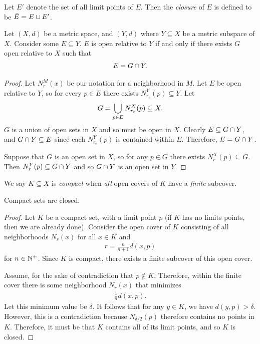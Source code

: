 \begin{defn}
    Let $E'$ denote the set of all limit points of $E$. Then the \emph{closure} of $E$ is defined to be $\bar{E} = E \cup E'$.
\end{defn}

\begin{thm}
    Let $(X, d)$ be a metric space, and $(Y, d)$ where $Y \subseteq X$ be a metric subspace of $X$. Consider some $E \subseteq Y$. $E$ is open relative to $Y$ if and only if there exists $G$ open relative to $X$ such that
    \begin{align*}
        E = G \cap Y.
    \end{align*}
\end{thm}

\begin{proof}
    Let $N_r^M(x)$ be our notation for a neighborhood in $M$. Let $E$ be open relative to $Y$, so for every $p \in E$ there exists $N_{r_e}^{Y}(p) \subseteq Y$. Let
    \begin{align*}
        G = \bigcup_{p \in E}N_{r_e}^{X}(p) \subseteq X.
    \end{align*}
    $G$ is a union of open sets in $X$ and so must be open in $X$. Clearly $E \subseteq G \cap Y$, and $G \cap Y \subseteq E$ since each $N_{r_e}^{Y}(p)$ is contained within $E$. Therefore, $E = G \cap Y$.

    Suppose that $G$ is an open set in $X$, so for any $p \in G$ there exists $N_{r}^{X}(p) \subseteq G$. Then $N_{r}^{Y}(p) \subseteq G \cap Y$ and so $G \cap Y$ is an open set in $Y$.
\end{proof}

\begin{defn}
    We say $K \subseteq X$ is \emph{compact} when \emph{all} open covers of $K$ have a \emph{finite} subcover.
\end{defn}

\begin{prop}
    Compact sets are closed.
\end{prop}

\begin{proof}
    Let $K$ be a compact set, with a limit point $p$ (if $K$ has no limits points, then we are already done). Consider the open cover of $K$ consisting of all neighborhoods $N_r(x)$ for all $x \in K$ and
    \begin{align*}
        r = \frac{n}{n+1}d(x, p)
    \end{align*}
    for $n \in \mathbb{N}^{+}$. Since $K$ is compact, there exists a finite subcover of this open cover.

    Assume, for the sake of contradiction that $p \not\in K$. Therefore, within the finite cover there is some neighborhood $N_{r}(x)$ that minimizes
    \begin{align*}
        \frac{1}{n}d(x, p).
    \end{align*}
    Let this minimum value be $\delta$. It follows that for any $y \in K$, we have $d(y, p) > \delta$. However, this is a contradiction because $N_{\delta/2}(p)$ therefore contains no points in $K$. Therefore, it must be that $K$ contains all of its limit points, and so $K$ is closed.
\end{proof}

